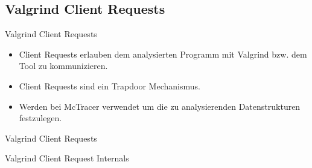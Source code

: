 \subsection{Valgrind Client Requests}

\begin{frame}{Valgrind Client Requests}
	\begin{itemize}
		\item Client Requests erlauben dem analysierten Programm mit Valgrind bzw. dem Tool zu kommunizieren.
		\pause \item Client Requests sind ein Trapdoor Mechanismus.
		\pause \item Werden bei McTracer verwendet um die zu analysierenden Datenstrukturen festzulegen.
	\end{itemize}

	\pause

	\lstset{frame=single}
	
\end{frame}

\begin{frame}{Valgrind Client Requests}
	\lstset{frame=single}
		
\end{frame}

\begin{frame}{Valgrind Client Request Internals}
	\lstset{frame=single}
		
\end{frame}
